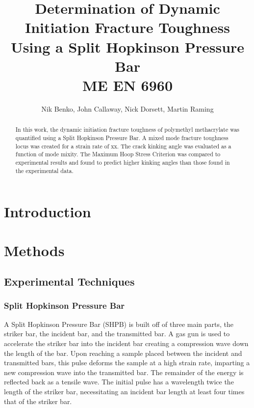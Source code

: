 \documentclass[12pt]{article}
\begin{document}
\title{ Determination of Dynamic Initiation Fracture Toughness Using a Split Hopkinson Pressure Bar  \\ \normalsize{ME EN 6960}}
\author{Nik Benko, John Callaway, Nick Dorsett, Martin Raming}
\maketitle

\begin{abstract} 
In this work, the dynamic initiation fracture toughness of polymethyl methacrylate was quantified using a Split Hopkinson Pressure Bar. A mixed mode fracture toughness locus was created for a strain rate of xx. The crack kinking angle was evaluated as a function of mode mixity. The Maximum Hoop Stress Criterion was compared to experimental results and found to predict higher kinking angles than those found in the experimental data.
\end{abstract}

\section{Introduction} %



\section{Methods}

\subsection{Experimental Techniques} 

\subsubsection {Split Hopkinson Pressure Bar} %

A Split Hopkinson Pressure Bar (SHPB) is built off of three main parts, the striker bar, the incident bar, and the transmitted bar. A gas gun is used to accelerate the striker bar into the incident bar creating a compression wave down the length of the bar. Upon reaching a sample placed between the incident and transmitted bars, this pulse deforms the sample at a high strain rate, imparting a new compression wave into the transmitted bar. The remainder of the energy is reflected back as a tensile wave. The initial pulse has a wavelength twice the length of the striker bar, necessitating an incident bar length at least four times that of the striker bar.
\end{document}
